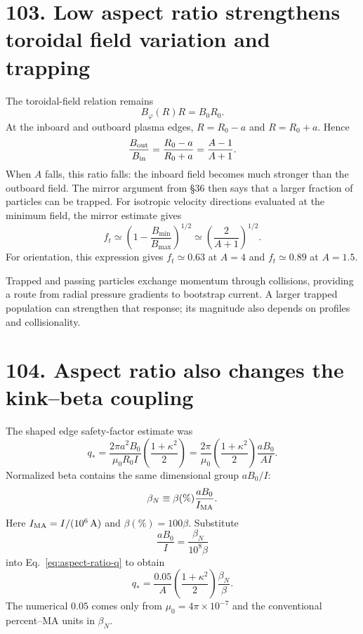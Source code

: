 \documentclass[11pt]{article}
\begin{document}
\section*{103. Low aspect ratio strengthens toroidal field variation and trapping}
The toroidal-field relation remains
\[
 B_\varphi(R)R=B_0R_0.
\]
At the inboard and outboard plasma edges, $R=R_0-a$ and $R=R_0+a$. Hence
\begin{equation}
 \frac{B_{\rm out}}{B_{\rm in}}
 =\frac{R_0-a}{R_0+a}
 =\frac{A-1}{A+1}.
 \label{eq:aspect-ratio-field-variation}
\end{equation}
When $A$ falls, this ratio falls: the inboard field becomes much stronger than the
outboard field. The mirror argument from \S36 then says that a larger fraction of
particles can be trapped. For isotropic velocity directions evaluated at the minimum
field, the mirror estimate gives
\begin{equation}
 f_t\simeq
 \left(1-\frac{B_{\min}}{B_{\max}}\right)^{1/2}
 \simeq\left(\frac{2}{A+1}\right)^{1/2}.
 \label{eq:aspect-ratio-trapped-fraction}
\end{equation}
For orientation, this expression gives $f_t\simeq0.63$ at $A=4$ and
$f_t\simeq0.89$ at $A=1.5$.

Trapped and passing particles exchange momentum through collisions, providing a
route from radial pressure gradients to bootstrap current. A larger trapped
population can strengthen that response; its magnitude also depends on profiles
and collisionality.


\section*{104. Aspect ratio also changes the kink--beta coupling}
The shaped edge safety-factor estimate was
\begin{equation}
 q_*=
\frac{2\pi a^2B_0}{\mu_0R_0I}
\left(\frac{1+\kappa^2}{2}\right)
=\frac{2\pi}{\mu_0}
\left(\frac{1+\kappa^2}{2}\right)
\frac{aB_0}{AI}.
 \label{eq:aspect-ratio-q}
\end{equation}
Normalized beta contains the same dimensional group $aB_0/I$:
\begin{equation}
 \beta_N\equiv
\beta(\%)\frac{aB_0}{I_{\rm MA}}.
 \label{eq:aspect-ratio-beta-n}
\end{equation}
Here $I_{\rm MA}=I/(10^6\,\mathrm A)$ and $\beta(\%)=100\beta$. Substitute
\[
 \frac{aB_0}{I}=\frac{\beta_N}{10^8\beta}
\]
into Eq.~\eqref{eq:aspect-ratio-q} to obtain
\begin{equation}
 q_*=
\frac{0.05}{A}
\left(\frac{1+\kappa^2}{2}\right)
\frac{\beta_N}{\beta}.
 \label{eq:aspect-ratio-q-beta}
\end{equation}
The numerical $0.05$ comes only from $\mu_0=4\pi\times10^{-7}$ and the conventional
percent--MA units in $\beta_N$.
\end{document}

